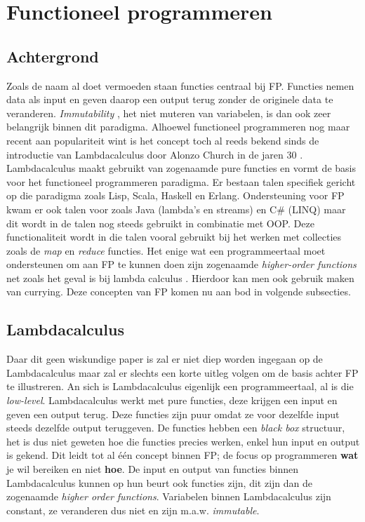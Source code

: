 \section{Functioneel programmeren}
\subsection{Achtergrond}
Zoals de naam al doet vermoeden staan functies centraal bij FP. Functies nemen data als input en geven daarop een output terug zonder de originele data te veranderen. \textit{Immutability} \autocite{Goetz2006}, het niet muteren van variabelen, is dan ook zeer belangrijk binnen dit paradigma. Alhoewel functioneel programmeren nog maar recent aan populariteit wint is het concept toch al reeds bekend sinds de introductie van Lambdacalculus door Alonzo Church in de jaren 30 \autocite{Church1941}. Lambdacalculus maakt gebruikt van zogenaamde pure functies en vormt de basis voor het functioneel programmeren paradigma. Er bestaan talen specifiek gericht op die paradigma zoals Lisp, Scala, Haskell en Erlang. Ondersteuning voor FP kwam er ook talen voor zoals Java (lambda's en streams) en C\# (LINQ) maar dit wordt in de talen nog steeds gebruikt in combinatie met OOP. Deze functionaliteit wordt in die talen vooral gebruikt bij het werken met collecties zoals de \textit{map} en \textit{reduce} functies. Het enige wat een programmeertaal moet ondersteunen om aan FP te kunnen doen zijn zogenaamde \textit{higher-order functions} net zoals het geval is bij lambda calculus \autocite{Federale2019}. Hierdoor kan men ook gebruik maken van currying. Deze concepten van FP komen nu aan bod in volgende subsecties.

\subsection{Lambdacalculus}
Daar dit geen wiskundige paper is zal er niet diep worden ingegaan op de Lambdacalculus maar zal er slechts een korte uitleg volgen om de basis achter FP te illustreren. An sich is Lambdacalculus eigenlijk een programmeertaal, al is die \textit{low-level}. Lambdacalculus werkt met pure functies, deze krijgen een input en geven een output terug. Deze functies zijn puur omdat ze voor dezelfde input steeds dezelfde output teruggeven. De functies hebben een \textit{black box} structuur, het is dus niet geweten hoe die functies precies werken, enkel hun input en output is gekend. Dit leidt tot al één concept binnen FP; de focus op programmeren \textbf{wat} je wil bereiken en niet \textbf{hoe}. De input en output van functies binnen Lambdacalculus kunnen op hun beurt ook functies zijn, dit zijn dan de zogenaamde \textit{higher order functions}. Variabelen binnen Lambdacalculus zijn constant, ze veranderen dus niet en zijn m.a.w. \textit{immutable}.

